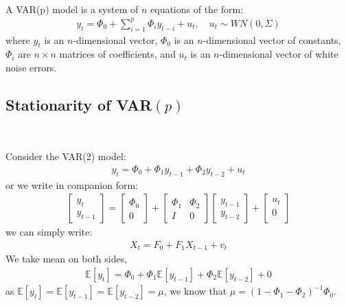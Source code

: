 \begin{definition}[VAR$(p)$]
    \

    A VAR(p) model is a system of $n$ equations of the form:
    \begin{gather*}
        y_t = \Phi_0 + \sum_{i=1}^{p} \Phi_i y_{t-i} + u_t, \quad u_t \sim WN(0, \Sigma)
    \end{gather*}
    where $y_t$ is an $n$-dimensional vector, $\Phi_0$ is an $n$-dimensional vector of constants, $\Phi_i$ are $n \times n$ matrices of coefficients, and $u_t$ is an $n$-dimensional vector of white noise errors.
\end{definition}

\subsection{Stationarity of VAR$(p)$}\label{sec:stationarity-var}
\begin{eg}
    \

    Consider the VAR(2) model:
    \begin{gather*}
        y_t = \Phi_0 + \Phi_1 y_{t-1} + \Phi_2 y_{t-2} + u_t
    \end{gather*}
    or we write in companion form:
    \begin{gather*}
        \begin{bmatrix}
            y_t \\
            y_{t-1}
        \end{bmatrix} = \begin{bmatrix}
            \Phi_0 \\
            0
        \end{bmatrix} + \begin{bmatrix}
            \Phi_1 & \Phi_2 \\
            I & 0
        \end{bmatrix} 
        \begin{bmatrix}
            y_{t-1} \\
            y_{t-2}
        \end{bmatrix} + \begin{bmatrix}
             u_t \\
             0 \\
        \end{bmatrix}
    \end{gather*}
    we can simply write:
    \begin{gather*}
        X_t = F_0 + F_1 X_{t-1} + v_t
    \end{gather*}
    We take mean on both sides,
    \begin{gather*}
        \mathbb{E}[y_t] = \Phi_0 + \Phi_1 \mathbb{E}[y_{t-1}] + \Phi_2 \mathbb{E}[y_{t-2}] + 0
    \end{gather*}
    as $\mathbb{E}[y_t] = \mathbb{E}[y_{t-1}] = \mathbb{E}[y_{t-2}] = \mu$,
    we know that $\mu = \left(1 - \Phi_1 - \Phi_2\right)^{-1} \Phi_0.$
\end{eg}

